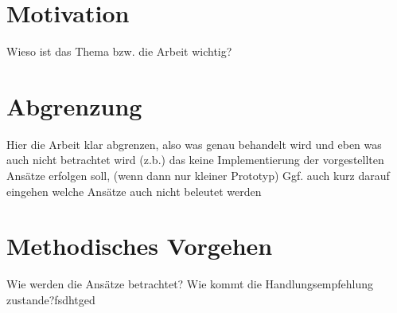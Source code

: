 \section{Motivation}

Wieso ist das Thema bzw. die Arbeit wichtig?

\section{Abgrenzung}

Hier die Arbeit klar abgrenzen, also was genau behandelt wird und eben was auch nicht betrachtet wird (z.b.) das keine Implementierung der vorgestellten Ansätze erfolgen soll, (wenn dann nur kleiner Prototyp)
Ggf. auch kurz darauf eingehen welche Ansätze auch nicht beleutet werden

\section{Methodisches Vorgehen}

Wie werden die Ansätze betrachtet? Wie kommt die Handlungsempfehlung zustande?fsdhtged